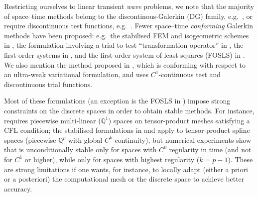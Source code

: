 \documentclass[a4paper]{article}
\theoremstyle{plain}
\theoremstyle{definition}
\begin{document}
Restricting ourselves to linear transient \emph{wave} problems, we note that the majority of space--time methods belong to the discontinous-Galerkin (DG) family, e.g.\ \cite{MoRi05}, or require discontinuous test functions, e.g.\ \cite{French1993}.
Fewer space--time \emph{conforming} Galerkin methods have been proposed: e.g.\
the stabilised FEM and isogeometric schemes in \cite{FraschiniLoliMoiolaSangalli2023,SteinbachZank2019stabilized,Zank2021higherorder},
the formulation involving a trial-to-test ``transformation operator'' in \cite[sect.~5]{steinbach2020coercive},
the first-order systems in \cite{BalesLasiecka1994}, and the first-order system of least squares (FOSLS) in \cite{FuhrerGonzalezKarkulik2025}.
We also mention the method proposed in \cite{HePaSiUr2022}, which is conforming with respect to an ultra-weak variational formulation, and uses $C^1$-continuous test and discontinuous trial functions.

Most of these formulations (an exception is the FOSLS in \cite{FuhrerGonzalezKarkulik2025}) impose strong constraints on the discrete spaces in order to obtain stable methods.
For instance, \cite[sect.~5]{steinbach2020coercive} requires piecewise multi-linear ($\mathbb Q^1$) spaces on tensor-product meshes satisfying a CFL condition;
the stabilised formulations in  \cite{SteinbachZank2019stabilized,Zank2021higherorder} and  \cite{FraschiniLoliMoiolaSangalli2023} apply to tensor-product spline spaces (piecewise $\mathbb Q^p$ with global $C^k$ continuity), but numerical experiments show that \cite{SteinbachZank2019stabilized,Zank2021higherorder} is unconditionally stable only for spaces with $C^0$ regularity in time (and not for $C^1$ or higher), while \cite{FraschiniLoliMoiolaSangalli2023} only for spaces with highest regularity ($k=p-1$).
These are strong limitations if one wants, for instance, to locally adapt (either a priori or a posteriori) the computational mesh or the discrete space to achieve better accuracy.
\end{document}
